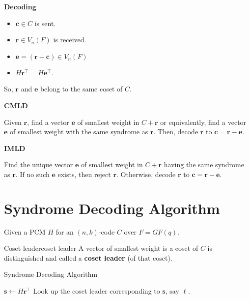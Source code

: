 \textbf{Decoding}
\begin{itemize}
    \item $ \bm{c}\in C $ is sent.
    \item $ \bm{r}\in V_n(F) $ is received.
    \item $ \bm{e}=(\bm{r}-\bm{c})\in V_n(F) $
    \item $ H\bm{r}^\top=H\bm{e}^\top $.
\end{itemize}
So, $ \bm{r} $ and $ \bm{e} $ belong to the same coset of $ C $.

\textbf{CMLD}

Given $ \bm{r} $, find a vector $ \bm{e} $ of smallest weight in $ C+\bm{r} $
or equivalently, find a vector $ \bm{e} $ of smallest weight with the same
syndrome as $ \bm{r} $. Then, decode $ \bm{r} $ to $ \bm{c}=\bm{r}-\bm{e} $.

\textbf{IMLD}

Find the unique vector $ \bm{e} $ of smallest weight in $ C+\bm{r} $
having the same syndrome as $ \bm{r} $.
If no such $ \bm{e} $ exists, then reject $ \bm{r} $.
Otherwise, decode $ \bm{r} $ to $ \bm{c}=\bm{r}-\bm{e} $.

\section{Syndrome Decoding Algorithm}
Given a PCM $ H $ for an $ (n,k) $-code $ C $ over $ F=GF(q) $.

\begin{Definition}{Coset leader}{coset leader}
    A vector of smallest weight is a coset of $ C $ is distinguished and called
    a \textbf{coset leader} (of that coset).
\end{Definition}

\begin{algbox}
    \begin{algorithm}[H]
        \DontPrintSemicolon{}
        \caption{Syndrome Decoding Algorithm}

        $ \bm{s}\gets H\bm{r}^\top $\;
        Look up the coset leader corresponding to $ \bm{s} $, say $ \bm{\ell} $.\;
    \end{algorithm}
\end{algbox}


